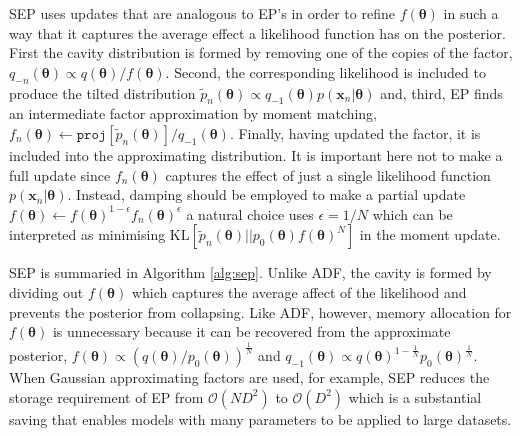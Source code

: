 %
%
SEP uses updates that are analogous to EP's in order to refine $f(\bm{\theta})$ in such a way that it captures the average effect a likelihood function has on the posterior. First the cavity distribution is formed by removing one of the copies of the factor, $q_{-n}(\bm{\theta}) \propto q(\bm{\theta})/f(\bm{\theta})$. 
Second, the corresponding likelihood is included to produce the tilted distribution $\tilde{p}_n(\bm{\theta}) \propto q_{-1}(\bm{\theta}) p(\bm{x}_n | \bm{\theta})$ and, third, EP finds an intermediate factor approximation by moment matching, $f_n(\bm{\theta}) \leftarrow \mathtt{proj}[\tilde{p}_n(\bm{\theta})] / q_{-1}(\bm{\theta}) $. Finally, having updated the factor, it is included into the approximating distribution. It is important here not to make a full update since $f_n(\bm{\theta})$ captures the effect of just a single likelihood function  $p(\bm{x}_n | \bm{\theta})$. Instead, damping should be employed to make a partial update $f(\bm{\theta}) \leftarrow f(\bm{\theta})^{1 - \epsilon} f_n(\bm{\theta})^{\epsilon}$ a natural choice uses $\epsilon = 1/N$ which can be interpreted as minimising  $\mathrm{KL}[\tilde{p}_n(\bm{\theta}) || p_{0}(\bm{\theta})  f(\bm{\theta})^N]$ in the moment update.

SEP is summaried in Algorithm \ref{alg:sep}. Unlike ADF, the cavity is formed by dividing out $f(\bm{\theta})$ which captures the average affect of the likelihood and prevents the posterior from collapsing. Like ADF, however, memory allocation for $f(\bm{\theta})$ is unnecessary because it can be recovered from the approximate posterior, $f(\bm{\theta}) \propto (q(\bm{\theta}) / p_0(\bm{\theta}))^{\frac{1}{N}}$ and $q_{-1}(\bm{\theta}) \propto q(\bm{\theta})^{1 - \frac{1}{N}} p_0(\bm{\theta})^{\frac{1}{N}}$. When Gaussian approximating factors are used, for example, SEP reduces the storage requirement of EP from  $\mathcal{O}(ND^2)$ to $\mathcal{O}(D^2)$ which is a substantial saving that enables models with many parameters to be applied to large datasets. 

